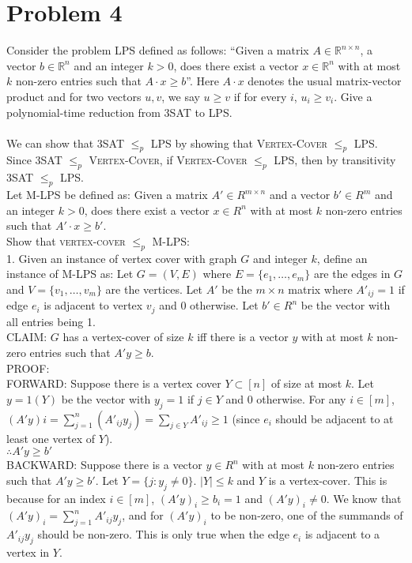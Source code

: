 \documentclass[10pt,letterpaper]{article}
\newcommand\tab[1][0.5cm]{\hspace*{#1}}
\begin{document}
\section{Problem 4}
Consider the problem \textsc{LPS} defined as follows: ``Given a matrix $A \in \mathbb{R}^{n \times n}$, a vector $b \in \mathbb{R}^n$ and an integer $k > 0$, does there exist a vector $x \in \mathbb{R}^n$ with at most $k$ non-zero entries such that $A \cdot x \geq b$''. Here $A \cdot x$ denotes the usual matrix-vector product and for two vectors $u,v$, we say $u \geq v$ if for every $i$, $u_i \geq v_i$. Give a polynomial-time reduction from \textsc{3SAT} to \textsc{LPS}.\\\\
We can show that \textsc{3SAT} $\leq_p$ \textsc{LPS} by showing that \textsc{Vertex-Cover} $\leq_p$ \textsc{LPS}.\\
Since \textsc{3SAT} $\leq_p$ \textsc{Vertex-Cover}, if \textsc{Vertex-Cover} $\leq_p$ \textsc{LPS}, then by transitivity \textsc{3SAT} $\leq_p$ \textsc{LPS}.\\
Let \textsc{M-LPS} be defined as: Given a matrix $A'\in R^{m \times n}$ and a vector $b'\in R^m$ and an integer $k > 0$, does there exist a vector $x \in R^n$ with at most $k$ non-zero entries such that $A'\cdot x \geq b'$.\\
Show that \textsc{vertex-cover} $\leq_p$ \textsc{M-LPS}:\\
1. Given an instance of vertex cover with graph $G$ and integer $k$, define an instance of \textsc{M-LPS} as: Let $G=(V,E)$ where $E=\{e_1,\dots,e_m\}$ are the edges in $G$ and $V=\{v_1,\dots,v_m\}$ are the vertices. Let $A'$ be the $m \times n$ matrix where $A'_{ij}=1$ if edge $e_i$ is adjacent to vertex $v_j$ and 0 otherwise. Let $b' \in R^n$ be the vector with all entries being 1.\\
\textsc{CLAIM}: $G$ has a vertex-cover of size $k$ iff there is a vector $y$ with at most $k$ non-zero entries such that $A'y\geq b$.\\
\textsc{PROOF}:\\
\tab \textsc{FORWARD}: Suppose there is a vertex cover $Y \subset [n]$ of size at most $k$. Let $y=1(Y)$ be the vector with $y_j=1$ if $j\in Y$ and 0 otherwise. For any $i \in [m]$, $(A'y)i=\sum_{j=1}^{n}(A'_{ij}y_j)=\sum_{j\in Y}A'_{ij} \geq 1$ (since $e_i$ should be adjacent to at least one vertex of $Y$).\\
\tab $\therefore A'y\geq b'$\\
\tab \textsc{BACKWARD}: Suppose there is a vector $y\in R^n$ with at most $k$ non-zero entries such that $A'y\geq b'$. Let $Y=\{j:y_j\neq0\}$. $|Y|\leq k$ and $Y$ is a vertex-cover. This is because for an index $i \in [m]$, $(A'y)_i\geq b_i = 1$ and $(A'y)_i\neq0$. We know that $(A'y)_i = \sum_{j=1}^{n}A'_{ij}y_j$, and for $(A'y)_i$ to be non-zero, one of the summands of $A'_{ij}y_j$ should be non-zero. This is only true when the edge $e_i$ is adjacent to a vertex in $Y$.\\
\end{document}
